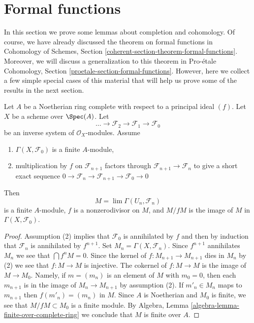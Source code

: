 \section{Formal functions}
\label{section-formal-functions}

\noindent
In this section we prove some lemmas about completion and cohomology.
Of course, we have already discussed the theorem on formal functions in
Cohomology of Schemes, Section \ref{coherent-section-theorem-formal-functions}.
Moreover, we will discuss a generalization to this theorem in
Pro-\'etale Cohomology, Section \ref{proetale-section-formal-functions}.
However, here we collect a few simple special cases of this material
that will help us prove some of the results in the next section.

\begin{lemma}
\label{lemma-limit-finite}
Let $A$ be a Noetherian ring complete with respect to a principal ideal $(f)$.
Let $X$ be a scheme over $\Spec(A)$. Let
$$
\ldots \to \mathcal{F}_2 \to \mathcal{F}_1 \to \mathcal{F}_0
$$
be an inverse system of $\mathcal{O}_X$-modules. Assume
\begin{enumerate}
\item $\Gamma(X, \mathcal{F}_0)$ is a finite $A$-module,
\item multiplication by $f$ on $\mathcal{F}_{n + 1}$ factors
through $\mathcal{F}_{n + 1} \to \mathcal{F}_n$ to give a
short exact sequence
$0 \to \mathcal{F}_n \to \mathcal{F}_{n + 1} \to \mathcal{F}_0 \to 0$
\end{enumerate}
Then
$$
M = \lim \Gamma(U_n, \mathcal{F}_n)
$$
is a finite $A$-module, $f$ is a nonzerodivisor on $M$, and
$M/fM$ is the image of $M$ in $\Gamma(X, \mathcal{F}_0)$.
\end{lemma}

\begin{proof}
Assumption (2) implies that $\mathcal{F}_0$ is annihilated by $f$
and then by induction that $\mathcal{F}_n$ is annihilated by $f^{n + 1}$.
Set $M_n = \Gamma(X, \mathcal{F}_n)$. Since $f^{n + 1}$ annihilates
$M_n$ we see that $\bigcap f^nM = 0$. Since the kernel of
$f : M_{n + 1} \to M_{n + 1}$ dies in $M_n$ by (2) we see that
$f : M \to M$ is injective. The cokernel of $f : M \to M$
is the image of $M \to M_0$. Namely, if $m = (m_n)$ is an element
of $M$ with $m_0 = 0$, then each $m_{n + 1}$ is in the image of
$M_n \to M_{n + 1}$ by assumption (2).
If $m'_n \in M_n$ maps to $m_{n + 1}$ then $f(m'_n) = (m_n)$ in $M$.
Since $A$ is Noetherian and $M_0$ is finite, we see that
$M/fM \subset M_0$ is a finite module. By
Algebra, Lemma \ref{algebra-lemma-finite-over-complete-ring}
we conclude that $M$ is finite over $A$.
\end{proof}

